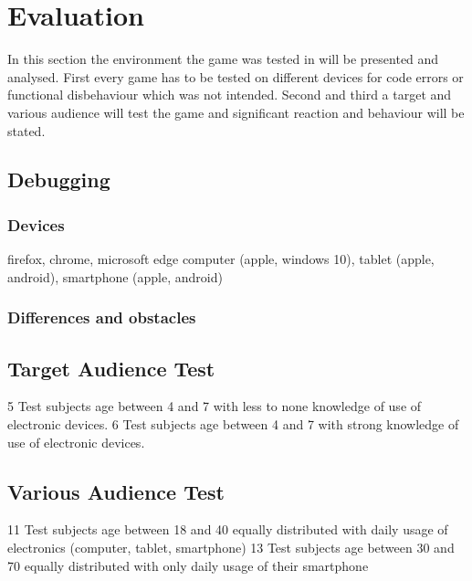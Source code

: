 
\chapter{Evaluation}
\label{chap:evaluation}

In this section the environment the game was tested in will be presented and analysed.
First every game has to be tested on different devices for code errors or functional disbehaviour which was not intended.
Second and third a target and various audience will test the game and significant reaction and behaviour will be stated.

\section{Debugging}
\subsection{Devices}
firefox, chrome, microsoft edge
computer (apple, windows 10), tablet (apple, android), smartphone (apple, android)
\subsection{Differences and obstacles}

\section{Target Audience Test}
5 Test subjects age between 4 and 7 with less to none knowledge of use of electronic devices.
6 Test subjects age between 4 and 7 with strong knowledge of use of electronic devices.

\section{Various Audience Test}
11 Test subjects age between 18 and 40 equally distributed with daily usage of electronics (computer, tablet, smartphone)
13 Test subjects age between 30 and 70 equally distributed with only daily usage of their smartphone

